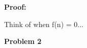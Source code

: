 \documentclass[12pt]{article}
\begin{document}
\par
\bigskip
{\bf Proof:}
\par
Think of when f(n) = 0...


\par

\par
\bigskip
{\bf Problem
    2
}
\end{document}
